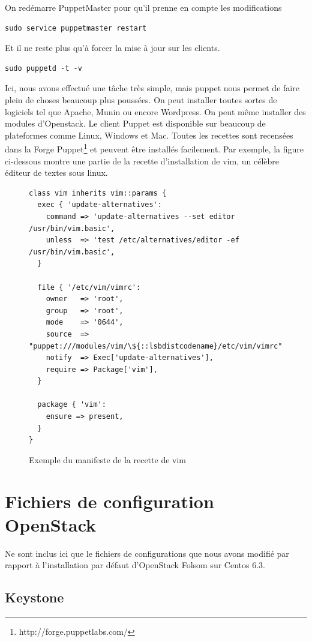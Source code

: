 \documentclass[a4paper,oneside]{report}
\begin{document}
On redémarre PuppetMaster pour qu'il prenne en compte les modifications
\begin{verbatim}
sudo service puppetmaster restart
\end{verbatim}

Et il ne reste plus qu'à forcer la mise à jour sur les clients.
\begin{verbatim}
sudo puppetd -t -v
\end{verbatim}

Ici, nous avons effectué une tâche très simple, mais puppet nous permet de faire plein de choses beaucoup plus poussées. On peut installer toutes sortes de logiciels tel que Apache, Munin ou encore Wordpress. 
On peut même installer des modules d'Openstack.
Le client Puppet est disponible sur beaucoup de plateformes comme Linux, Windows et Mac.
Toutes les recettes sont recensées dans la Forge Puppet\footnote{http://forge.puppetlabs.com/} et peuvent être installés facilement.
Par exemple, la figure ci-dessous montre une partie de la recette d'installation de vim, un célèbre éditeur de textes sous linux.

\begin{figure}[!h]
\begin{center}
\begin{Verbatim}[frame=single]
class vim inherits vim::params {
  exec { 'update-alternatives':
    command => 'update-alternatives --set editor /usr/bin/vim.basic',
    unless  => 'test /etc/alternatives/editor -ef /usr/bin/vim.basic',
  }

  file { '/etc/vim/vimrc':
    owner   => 'root',
    group   => 'root',
    mode    => '0644',
    source  => "puppet:///modules/vim/\${::lsbdistcodename}/etc/vim/vimrc",
    notify  => Exec['update-alternatives'],
    require => Package['vim'],
  }

  package { 'vim':
    ensure => present,
  }
}
\end{Verbatim}
\caption*{Exemple du manifeste de la recette de vim}
\end{center}
\end{figure}

\chapter{Fichiers de configuration OpenStack}
Ne sont inclus ici que le fichiers de configurations que nous avons modifié par rapport à l'installation par défaut d'OpenStack Folsom sur Centos 6.3.
\section{Keystone} \label{conf:Keystone}
\end{document}
